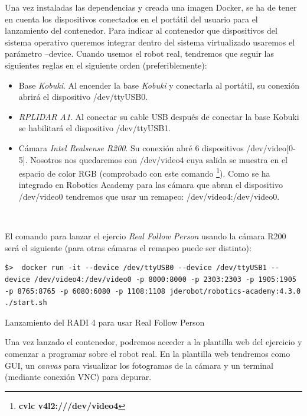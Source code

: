 Una vez instaladas las dependencias y creada una imagen Docker, se ha de tener en cuenta los dispositivos conectados en el portátil del usuario para el lanzamiento del contenedor. Para indicar al contenedor que dispositivos del sistema operativo queremos integrar dentro del sistema virtualizado usaremos el parámetro --device. Cuando usemos el robot real, tendremos que seguir las siguientes reglas en el siguiente orden (preferiblemente):

\begin{itemize}
	\item Base \textit{Kobuki}. Al encender la base \textit{Kobuki} y conectarla al portátil, su conexión abrirá el dispositivo /dev/ttyUSB0.
	\item \textit{RPLIDAR A1}. Al conectar su cable USB después de conectar la base Kobuki se habilitará el dispositivo /dev/ttyUSB1.
	\item Cámara \textit{Intel Realsense R200}. Su conexión abré 6 dispositivos /dev/video[0-5]. Nosotros nos quedaremos con /dev/video4 cuya salida se muestra en el espacio de color RGB (comprobado con este comando \footnote{\textbf{cvlc v4l2:///dev/video4}}). Como se ha integrado en Robotics Academy para las cámara que abran el dispositivo /dev/video0 tendremos que usar un remapeo: /dev/video4:/dev/video0.
\end{itemize}\

El comando para lanzar el ejercio \textit{Real Follow Person} usando la cámara R200 será el siguiente (para otras cámaras el remapeo puede ser distinto):\\

\begin{code}[H]
\begin{lstlisting}
$>  docker run -it --device /dev/ttyUSB0 --device /dev/ttyUSB1 --device /dev/video4:/dev/video0 -p 8000:8000 -p 2303:2303 -p 1905:1905 -p 8765:8765 -p 6080:6080 -p 1108:1108 jderobot/robotics-academy:4.3.0 ./start.sh
\end{lstlisting}
\caption{Lanzamiento del RADI 4 para usar Real Follow Person}
\label{cod:lanzamiento_radi_real_follow_person}
\end{code}

Una vez lanzado el contenedor, podremos acceder a la plantilla web del ejercicio y comenzar a programar sobre el robot real. En la plantilla web tendremos como GUI, un \textit{canvas} para visualizar los fotogramas de la cámara y un terminal (mediante conexión VNC) para depurar.

